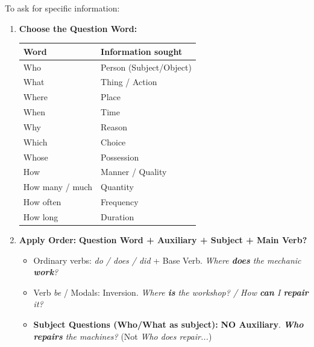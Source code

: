 \documentclass[11pt]{article}
\begin{document}
\begin{methode}
To ask for specific information:
\begin{enumerate}
\item \textbf{Choose the Question Word:}
\begin{center}
\begin{tabular}{|l|l|}\hline
\textbf{Word} & \textbf{Information sought} \\ \hline
Who & Person (Subject/Object) \\
What & Thing / Action \\
Where & Place \\
When & Time \\
Why & Reason \\
Which & Choice \\
Whose & Possession \\
How & Manner / Quality \\
How many / much & Quantity \\
How often & Frequency \\
How long & Duration \\
\hline
\end{tabular}
\end{center}
\item \textbf{Apply Order:} \textbf{Question Word + Auxiliary + Subject + Main Verb?}
\begin{itemize}
\item Ordinary verbs: \emph{do / does / did} + Base Verb. \emph{Where \textbf{does} the mechanic \textbf{work}?}
\item Verb \emph{be} / Modals: Inversion. \emph{Where \textbf{is} the workshop? / How \textbf{can} I \textbf{repair} it?}
\item \textbf{Subject Questions (Who/What as subject):} \textbf{NO Auxiliary}. \emph{\textbf{Who} \textbf{repairs} the machines?} (Not \emph{Who does repair...})
\end{itemize}
\end{enumerate}
\end{methode}
\end{document}
